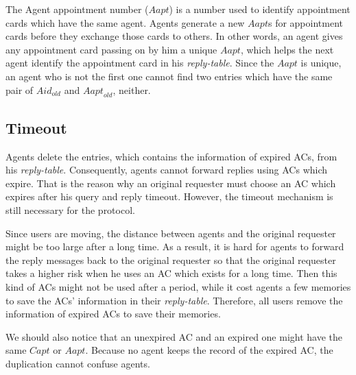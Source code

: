 \noindent The Agent appointment number ($Aapt$) is a number used to identify appointment cards which have the same agent. Agents generate a new $Aapt$s for appointment cards before they exchange those cards to others. In other words, an agent gives any appointment card passing on by him a unique $Aapt$, which helps the next agent identify the appointment card in his \textit{reply-table}. Since the $Aapt$ is unique, an agent who is not the first one cannot find two entries which have the same pair of ${Aid}_{old}$ and ${Aapt}_{old}$, neither.


\subsection{ Timeout}

\noindent Agents delete the entries, which contains the information of expired ACs, from his \textit{reply-table}. Consequently, agents cannot forward replies using ACs which expire. That is the reason why an original requester must choose an AC which expires after his query and reply timeout. However, the timeout mechanism is still necessary for the protocol.

Since users are moving, the distance between agents and the original requester might be too large after a long time. As a result, it is hard for agents to forward the reply messages back to the original requester so that the original requester takes a higher risk when he uses an AC which exists for a long time. Then this kind of ACs might not be used after a period, while it cost agents a few memories to save the ACs' information in their \textit{reply-table}. Therefore, all users remove the information of expired ACs to save their memories.

We should also notice that an unexpired AC and an expired one might have the same $Capt$ or $Aapt$. Because no agent keeps the record of the expired AC, the duplication cannot confuse agents.




































